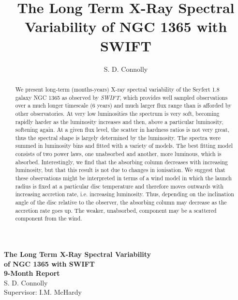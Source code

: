 \documentclass[letters,useAMS,usenatbib]{samnote}
\title[The Long Term X-Ray Spectral Variability of NGC 1365 with SWIFT]{The Long Term X-Ray Spectral Variability of NGC 1365 with SWIFT}
\author[S. D. Connolly]{S. D. Connolly}
\begin{document}

\pagerange{\pageref{firstpage}--\pageref{lastpage}} 

\vspace{\fill}
 \begin{titlepage}
    \vspace*{\fill}
    \begin{center}
      {\Huge \bf The Long Term X-Ray Spectral Variability\\[0.2cm] of NGC 1365 with SWIFT}\\[1cm]
      {\huge \bf 9-Month Report}\\[2cm]
      
      {\huge S. D. Connolly}\\[1cm]
      {\Large Supervisor: I.M. McHardy}\\[0.4cm]

    \end{center}
    \vspace*{\fill}




\label{firstpage}

\begin{abstract}
\vspace{0.5cm}
\begin{center} 

We present long-term (months-years) X-ray spectral variability of the
Seyfert 1.8 galaxy NGC 1365 as observed by {\it SWIFT}, which provides
well sampled observations over a much longer timescale (6 years) and
much larger flux range than is afforded by other observatories. At
very low luminosities the spectrum is very soft, becoming rapidly
harder as the luminosity increases and then, above a particular
luminosity, softening again.  At a given flux level, the scatter
in hardness ratios is not very great, thus the spectral shape is
largely determined by the luminosity.  The spectra were summed in
luminosity bins and fitted with a variety of models. The best fitting model
consists of two power laws, one unabsorbed and another, more luminous,
which is absorbed. Interestingly, we find that the absorbing column
decreases with increasing luminosity, but that this result is not due
to changes in ionisation. We suggest that these observations might be
interpreted in terms of a wind model in which the launch radius is
fixed at a particular disc temperature and therefore moves outwards with
increasing accretion rate, i.e. increasing luminosity. Thus, depending
on the inclination angle of the disc relative to the observer, the absorbing column may decrease
as the accretion rate goes up. The weaker, unabsorbed, component may
be a scattered component from the wind. 

\end{center} 
\end{abstract}
\vspace{\fill}

\end{titlepage}
\end{document}
